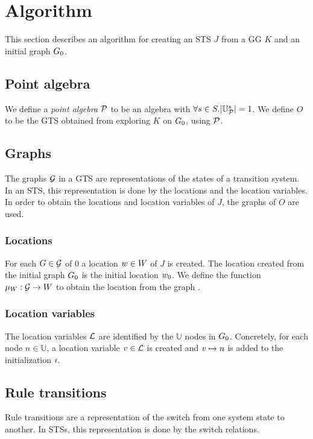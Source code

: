 \section{Algorithm}
This section describes an algorithm for creating an STS $J$ from a GG $K$ and an initial graph $G_0$. 

\subsection{Point algebra}
We define a \textit{point algebra} $\mathcal{P}$ to be an algebra with $\forall s \in S . |\mathbb{U}_{\mathcal{P}}^s| = 1$. We define $O$ to be the GTS obtained from exploring $K$ on $G_0$, using $\mathcal{P}$.

\subsection{Graphs}
The graphs $\mathcal{G}$ in a GTS are representations of the states of a transition system. In an STS, this representation is done by the locations and the location variables. In order to obtain the locations and location variables of $J$, the graphs of $O$ are used.

\subsubsection{Locations}
For each $G \in \mathcal{G}$ of $0$ a location $w \in W$ of $J$ is created. The location created from the initial graph $G_0$ is the initial location $w_0$. We define the function $\mu_W: \mathcal{G} \rightarrow W$ to obtain the location from the graph .

\subsubsection{Location variables}
The location variables $\mathcal{L}$ are identified by the $\mathbb{U}$ nodes in $G_0$. Concretely, for each node $n \in \mathbb{U}$, a location variable $v \in \mathcal{L}$ is created and $v \mapsto n$ is added to the initialization $\imath$.

\subsection{Rule transitions}
Rule transitions are a representation of the switch from one system state to another. In STSs, this representation is done by the switch relations.

